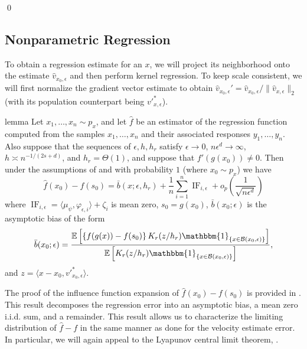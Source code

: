 \documentclass[11pt]{article}
\begin{document}
\qed{}

\subsection{Nonparametric Regression}  \label{sec: regression results presentation}

To obtain a regression estimate for an $x$, we will project its neighborhood onto the estimate $\hat{v}_{x_0, \epsilon}$ and then perform kernel regression. To keep scale consistent, we will first normalize the gradient vector estimate to obtain $\hat{v}_{x_0, \epsilon}' = \hat{v}_{x_0, \epsilon}/\|\hat{v}_{x, \epsilon}\|_2$ (with its population counterpart being $v'^{*}_{x, \epsilon}$). 

\begin{restatable}{lemma}{} \label{thm: regression ptwise decomp}
    Let $x_1, \dots, x_n \sim p_x$, and let $\hat{f}$ be an estimator of the regression function computed from the samples $x_1, \dots, x_n$ and their associated responses $y_1, \dots, y_n$. Also suppose that the sequences of $\epsilon, h, h_r$ satisfy $\epsilon \rightarrow 0$, $n\epsilon^d \rightarrow \infty$, $h\asymp n^{-1/(2s+d)}$, and $h_r = \Theta(1)$, and suppose that $f'(g(x_0)) \neq 0$. Then under the assumptions of  and with probability $1$ (where $x_0 \sim p_x$)  we have
    \begin{equation*}
    \hat{f}(x_0) - f(s_0) = \bar{b}(x; \epsilon, h_r) + \frac{1}{n}\sum_{i = 1}^n\operatorname{IF}_{i, \epsilon} + o_p\left(\frac{1}{\sqrt{n\epsilon^d}}\right)
    \end{equation*}
    where $\operatorname{IF}_{i, \epsilon} = \langle \mu_{\psi}, \varphi_{\epsilon, i}\rangle + \zeta_i$ is mean zero, $s_0 = g(x_0)$, $\bar{b}(x_0;\epsilon)$ is the asymptotic bias of the form
    \begin{equation*}
        \bar{b}(x_0; \epsilon) = \frac{\mathbb{E}\left[\left\{f(g(x)) - f(s_0)\right\}K_r(z/h_r)\mathbbm{1}_{\{x\in \mathcal{B}(x_0, \epsilon)\}}\right]}{\mathbb{E}\left[K_r(z/h_r)\mathbbm{1}_{\{x\in \mathcal{B}(x_0, \epsilon)\}}\right]},
    \end{equation*}
    and $z = \langle x - x_0, v'^*_{x_0, \epsilon}\rangle$.
\end{restatable}
The proof of the influence function expansion of $\hat{f}(x_0) - f(s_0)$ is provided in . This result decomposes the regression error into an asymptotic bias, a mean zero i.i.d. sum, and a remainder. This result allows us to characterize the limiting distribution of $\hat{f} - f$ in the same manner as done for the velocity estimate error. In particular, we will again appeal to the Lyapunov central limit theorem, . 
\end{document}
